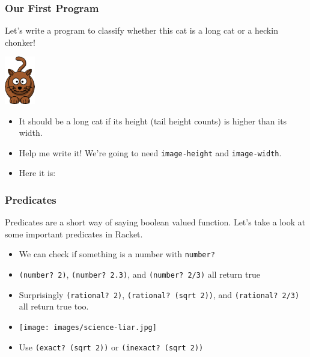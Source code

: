 \documentclass{beamer}
\begin{document}

\begin{frame}
  \frametitle{Our First Program}
  Let's write a program to classify whether this cat is a long cat or a heckin
  chonker!
  \begin{center}
    \includegraphics[width=0.1\textwidth]{images/cat.png}    
  \end{center}
  \begin{itemize}
  \item<2-> It should be a long cat if its height (tail height counts) is higher
    than its width.
  \item<3-> Help me write it! We're going to need
    \texttt{image-height} and \texttt{image-width}.
  \item<4-> Here it is: \catProgram
  \end{itemize}
\end{frame}

\begin{frame}
  \frametitle{Predicates}
  Predicates are a short way of saying boolean valued function. Let's take
  a look at some important predicates in Racket.
  \begin{itemize}
  \item<2-> We can check if something is a number with \texttt{number?}
  \item<3-> \texttt{(number? 2)}, \texttt{(number? 2.3)}, and \texttt{(number? 2/3)} all return true
  \item<4-> Surprisingly \texttt{(rational? 2)}, \texttt{(rational? (sqrt 2))}, and \texttt{(rational? 2/3)} all return true too.
  \item<5-> \texttt{[image: images/science-liar.jpg]}
  \item<6-> Use \texttt{(exact? (sqrt 2))} or \texttt{(inexact? (sqrt 2))}
  \end{itemize}
\end{frame}
\end{document}

